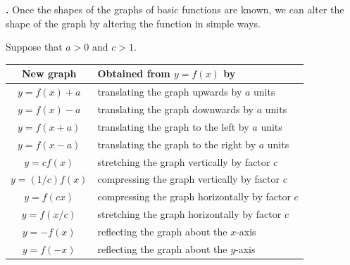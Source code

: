 \documentclass[t]{beamer}
\theoremstyle{plain}
\theoremstyle{definition}
\newcounter{heading}
\newcommand{\newhead}[1]{\medskip\stepcounter{heading}\noindent\textbf{\hspace{0.2cm}{#1}.}}
\begin{document}
%
%

\begin{frame}
\newhead{Function transformations} Once the shapes of the graphs of basic functions are known, we can alter the shape of the graph by altering the function in simple ways. 

\noindent Suppose that $a>0$ and $c>1$.

\begin{center}
\begin{tabular}{| c | l |}
\hline
New graph & Obtained from $y=f(x)$ by \\
\hline
$y=f(x)+a$ & translating the graph upwards by $a$ units \\
$y=f(x)-a$ & translating the graph downwards by $a$ units \\
$y=f(x+a)$ & translating the graph to the left by $a$ units \\
$y=f(x-a)$ & translating the graph to the right by $a$ units \\
\hline
$y=cf(x)$ & stretching the graph vertically by factor $c$ \\
$y=(1/c)f(x)$ & compressing the graph vertically by factor $c$ \\
$y=f(cx)$ & compressing the graph horizontally by factor $c$ \\
$y=f(x/c)$ & stretching the graph horizontally by factor $c$ \\
\hline
$y=-f(x)$ & reflecting the graph about the $x$-axis \\
$y=f(-x)$ & reflecting the graph about the $y$-axis \\
\hline
\end{tabular}
\end{center}
\end{frame}
\end{document}
